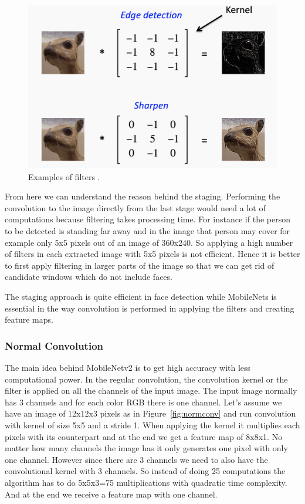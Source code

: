 \begin{figure}[!htb]
    \centering
    \includegraphics[width=1\textwidth]{figures/filters.png}
    \caption{Examples of filters \cite{simpleconvolution}.}
    \label{fig:filter}
\end{figure}
From here we can understand the reason behind the staging. Performing the convolution to the image directly from the last stage would need a lot of computations because filtering takes processing time. For instance if the person to be detected is standing far away and in the image that person may cover for example only 5x5 pixels out of an image of 360x240. So applying a high number of filters in each extracted image with 5x5 pixels is not efficient. Hence it is better to first apply filtering in larger parts of the image so that we can get rid of candidate windows which do not include faces.

The staging approach is quite efficient in face detection while MobileNets is essential in the way convolution is performed in applying the filters and creating feature maps. 



\subsubsection{Normal Convolution}

The main idea behind MobileNetv2 is to get high accuracy with less computational power. In the regular convolution, the convolution kernel or the filter is applied on all the channels of the input image. The input image normally has 3 channels and for each color RGB there is one channel. Let's assume we have an image of 12x12x3 pixels as in Figure~\ref{fig:normconv} and run convolution with kernel of size 5x5 and a stride 1. When applying the kernel it multiplies each pixels with its counterpart and at the end we get a feature map of 8x8x1. No matter how many channels the image has it only generates one pixel with only one channel.
However since there are 3 channels we need to also have the convolutional kernel with 3 channels. So instead of doing 25 computations the algorithm has to do 5x5x3=75 multiplications with quadratic time complexity. And at the end we receive a feature map with one channel. 

